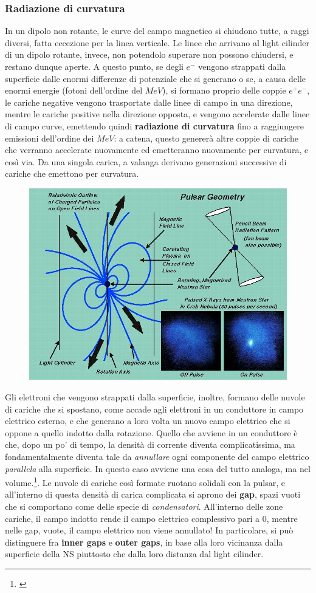 \subsubsection{Radiazione di curvatura}
In un dipolo non rotante, le curve del campo magnetico si chiudono tutte, a raggi diversi, fatta eccezione per la linea verticale.
Le linee che arrivano al light cilinder di un dipolo rotante, invece, non potendolo superare non possono chiudersi, e restano dunque aperte.
A questo punto, se degli $e^-$ vengono strappati dalla superficie dalle enormi differenze di potenziale che si generano o se, a causa delle enormi energie (fotoni dell'ordine del $MeV$), si formano proprio delle coppie $e^+e^-$, le cariche negative vengono trasportate dalle linee di campo in una direzione, mentre le cariche positive nella direzione opposta, e vengono accelerate dalle linee di campo curve, emettendo quindi \textbf{radiazione di curvatura} fino a raggiungere emissioni dell'ordine dei $MeV$: a catena, questo genererà altre coppie di cariche che verranno accelerate nuovamente ed emetteranno nuovamente per curvatura, e così via.
Da una singola carica, a valanga derivano generazioni successive di cariche che emettono per curvatura.
\begin{figure}[h!]
    \centering
    \includegraphics[width=0.5\linewidth]{Immagini/light cilinder.jpg}
    \label{fig: pulsar con light cilinder}
\end{figure}
Gli elettroni che vengono strappati dalla superficie, inoltre, formano delle nuvole di cariche che si spostano, come accade agli elettroni in un conduttore in campo elettrico esterno, e che generano a loro volta un nuovo campo elettrico che si oppone a quello indotto dalla rotazione.  
Quello che avviene in un conduttore è che, dopo un po' di tempo, la densità di corrente diventa complicatissima, ma fondamentalmente diventa tale da \textit{annullare} ogni componente del campo elettrico \textit{parallela} alla superficie. In questo caso avviene una cosa del tutto analoga, ma nel volume.\footnote{ \cite{Goldreich_Julian}}.
Le nuvole di cariche così formate ruotano solidali con la pulsar, e all'interno di questa densità di carica complicata si aprono dei \textbf{gap}, spazi vuoti che si comportano come delle specie di \textit{condensatori}.
All'interno delle zone cariche, il campo indotto rende il campo elettrico complessivo pari a $0$, mentre nelle gap, vuote, il campo elettrico non viene annullato!
In particolare, si può distinguere fra \textbf{inner gaps} e \textbf{outer gaps}, in base alla loro vicinanza dalla superficie della NS piuttosto che dalla loro distanza dal light cilinder.


